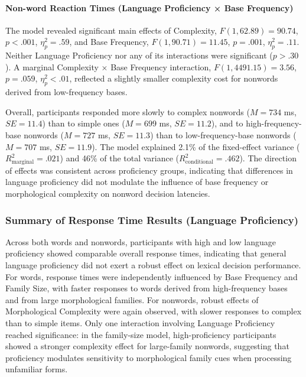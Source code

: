 	\paragraph{Non-word Reaction Times (Language Proficiency × Base Frequency)}
	
	The model revealed significant main effects of Complexity, $F(1, 62.89) = 90.74$, $p < .001$, $\eta_p^2 = .59$, and Base Frequency, $F(1, 90.71) = 11.45$, $p = .001$, $\eta_p^2 = .11$. Neither Language Proficiency nor any of its interactions were significant ($p > .30$). A marginal Complexity × Base Frequency interaction, $F(1, 4491.15) = 3.56$, $p = .059$, $\eta_p^2 < .01$, reflected a slightly smaller complexity cost for nonwords derived from low-frequency bases.
	
	Overall, participants responded more slowly to complex nonwords ($M = 734$ ms, $SE = 11.4$) than to simple ones ($M = 699$ ms, $SE = 11.2$), and to high-frequency-base nonwords ($M = 727$ ms, $SE = 11.3$) than to low-frequency-base nonwords ($M = 707$ ms, $SE = 11.9$). The model explained 2.1\% of the fixed-effect variance ($R^2_{\text{marginal}} = .021$) and 46\% of the total variance ($R^2_{\text{conditional}} = .462$). The direction of effects was consistent across proficiency groups, indicating that differences in language proficiency did not modulate the influence of base frequency or morphological complexity on nonword decision latencies.
	
	\subsubsection{Summary of Response Time Results (Language Proficiency)}
	
	Across both words and nonwords, participants with high and low language proficiency showed comparable overall response times, indicating that general language proficiency did not exert a robust effect on lexical decision performance. For words, response times were independently influenced by Base Frequency and Family Size, with faster responses to words derived from high-frequency bases and from large morphological families. For nonwords, robust effects of Morphological Complexity were again observed, with slower responses to complex than to simple items. Only one interaction involving Language Proficiency reached significance: in the family-size model, high-proficiency participants showed a stronger complexity effect for large-family nonwords, suggesting that proficiency modulates sensitivity to morphological family cues when processing unfamiliar forms. 
	
